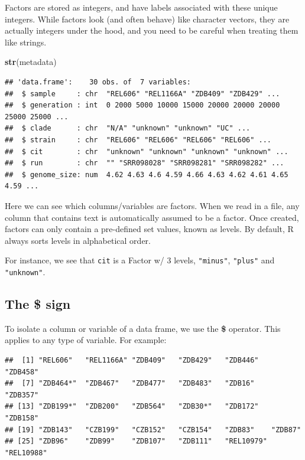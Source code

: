 \documentclass[
]{book}
\newenvironment{Shaded}{\begin{snugshade}}{\end{snugshade}}
\newcommand{\FunctionTok}[1]{\textcolor[rgb]{0.13,0.29,0.53}{\textbf{#1}}}
\newcommand{\NormalTok}[1]{#1}
\newcommand{\SpecialCharTok}[1]{\textcolor[rgb]{0.81,0.36,0.00}{\textbf{#1}}}
\begin{document}
Factors are stored as integers, and have labels associated with these unique integers. While factors look (and often behave) like character vectors, they are actually integers under the hood, and you need to be careful when treating them like strings.

\begin{Shaded}
\begin{Highlighting}[]
\FunctionTok{str}\NormalTok{(metadata)}
\end{Highlighting}
\end{Shaded}

\begin{verbatim}
## 'data.frame':    30 obs. of  7 variables:
##  $ sample     : chr  "REL606" "REL1166A" "ZDB409" "ZDB429" ...
##  $ generation : int  0 2000 5000 10000 15000 20000 20000 20000 25000 25000 ...
##  $ clade      : chr  "N/A" "unknown" "unknown" "UC" ...
##  $ strain     : chr  "REL606" "REL606" "REL606" "REL606" ...
##  $ cit        : chr  "unknown" "unknown" "unknown" "unknown" ...
##  $ run        : chr  "" "SRR098028" "SRR098281" "SRR098282" ...
##  $ genome_size: num  4.62 4.63 4.6 4.59 4.66 4.63 4.62 4.61 4.65 4.59 ...
\end{verbatim}

Here we can see which columns/variables are factors. When we read in a file, any column that contains text is automatically assumed to be a factor. Once created, factors can only contain a pre-defined set values, known as levels. By default, R always sorts levels in alphabetical order.

For instance, we see that \texttt{cit} is a Factor w/ 3 levels, \texttt{"minus"}, \texttt{"plus"} and \texttt{"unknown"}.

\subsection*{The \$ sign}\label{the-sign}

To isolate a column or variable of a data frame, we use the \textbf{\$} operator. This applies to any type of variable. For example:

\begin{Shaded}
\end{Shaded}

\begin{verbatim}
##  [1] "REL606"   "REL1166A" "ZDB409"   "ZDB429"   "ZDB446"   "ZDB458"  
##  [7] "ZDB464*"  "ZDB467"   "ZDB477"   "ZDB483"   "ZDB16"    "ZDB357"  
## [13] "ZDB199*"  "ZDB200"   "ZDB564"   "ZDB30*"   "ZDB172"   "ZDB158"  
## [19] "ZDB143"   "CZB199"   "CZB152"   "CZB154"   "ZDB83"    "ZDB87"   
## [25] "ZDB96"    "ZDB99"    "ZDB107"   "ZDB111"   "REL10979" "REL10988"
\end{verbatim}
\end{document}
